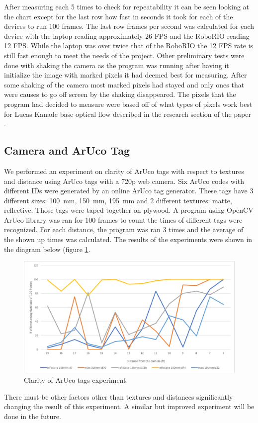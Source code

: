 \documentclass{article}
\begin{document}
	After measuring each 5 times to check for repeatability it can be seen looking at the chart except for the last row how fast in seconds it took for each of the devices to run 100 frames. The last row frames per second was calculated for each device with the laptop reading approximately 26 FPS and the RoboRIO reading 12 FPS. While the laptop was over twice that of the RoboRIO the 12 FPS rate is still fast enough to meet the needs of the project. Other preliminary tests were done with shaking the camera as the program was running after having it initialize the image with marked pixels it had deemed best for measuring. After some shaking of the camera most marked pixels had stayed and only ones that were causes to go off screen by the shaking disappeared. The pixels that the program had decided to measure were based off of what types of pixels work best for Lucas Kanade base optical flow described in the research section of the paper		.

    \subsection{Camera and ArUco Tag}
    	We performed an experiment on clarity of ArUco tags with respect to textures and distance using ArUco tags with a 720p web camera. Six ArUco codes with different IDs were generated by an online ArUco tag generator. These tags have 3 different sizes: \SI{100}{\milli\meter}, \SI{150}{\milli\meter}, \SI{195}{\milli\meter} and 2 different textures: matte, reflective. Those tags were taped together on plywood.
A program using OpenCV ArUco library was ran for 100 frames to count the times of different tags were recognized. For each distance, the program was ran 3 times and the average of the shown up times was calculated. The results of the experiments were shown in the diagram below (figure \ref{fig:aruco_clarity}.

    \begin{figure}[H]
      \centering
      \includegraphics[width = \linewidth]{./images/camera_aterm_experiment.png}
      \caption{Clarity of ArUco tags experiment}
      \label{fig:aruco_clarity}
    \end{figure}
    There must be other factors other than textures and distances significantly changing the result of this experiment. A similar but improved experiment will be done in the future.
\end{document}
